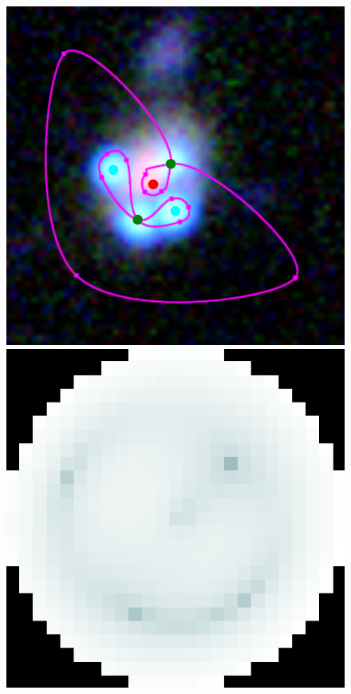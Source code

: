 \begin{figure}
  \centering

  \includegraphics[width=\myplotswidth]{fig/006915_input}
  \includegraphics[width=\myplotswidth]{fig/006915_arr_time} \\

\end{figure}
